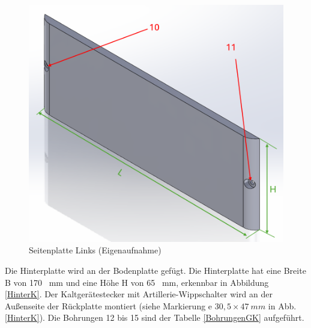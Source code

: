 	\begin{figure}[H]
		\begin{center}
			\includegraphics[width=\textwidth]{Images/Konstruktion/SeiteLK.png}
			\caption{Seitenplatte Links (Eigenaufnahme)} \label{SeiteLK}
		\end{center}
	\end{figure}

Die Hinterplatte wird an der Bodenplatte gefügt. Die Hinterplatte hat eine Breite B von 170 \ mm und eine Höhe H von 65 \ mm, erkennbar in Abbildung \ref{HinterK}. Der Kaltgerätestecker mit Artillerie-Wippschalter wird an der Außenseite der Rückplatte montiert (siehe Markierung e $30,5 \times 47 \ mm$  in Abb.\ref{HinterK}). Die Bohrungen 12 bis 15 sind der Tabelle \ref{BohrungenGK} aufgeführt.


